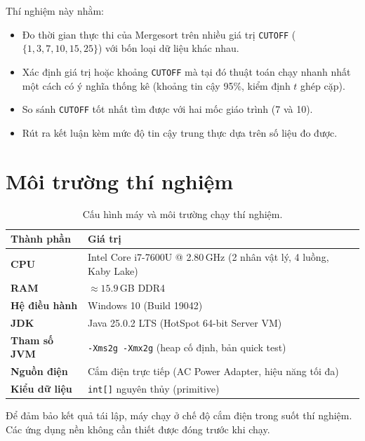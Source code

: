 \documentclass[12pt, a4paper]{article}
\begin{document}
Thí nghiệm này nhằm:
\begin{itemize}
    \item Đo thời gian thực thi của Mergesort trên nhiều giá trị \texttt{CUTOFF}
          ($\{1, 3, 7, 10, 15, 25\}$) với bốn loại dữ liệu khác nhau.
    \item Xác định giá trị hoặc khoảng \texttt{CUTOFF} mà tại đó thuật toán chạy
          nhanh nhất một cách có ý nghĩa thống kê (khoảng tin cậy 95\%, kiểm định
          $t$ ghép cặp).
    \item So sánh \texttt{CUTOFF} tốt nhất tìm được với hai mốc giáo trình (7 và 10).
    \item Rút ra kết luận kèm mức độ tin cậy trung thực dựa trên số liệu đo được.
\end{itemize}

\section{Môi trường thí nghiệm}

\begin{table}[H]
\centering
\caption{Cấu hình máy và môi trường chạy thí nghiệm.}
\label{tab:env}
\renewcommand{\arraystretch}{1.3}
\begin{tabular}{>{\bfseries}l p{10cm}}
\toprule
Thành phần & Giá trị \\
\midrule
\rowcolor{rowodd}  CPU      & Intel Core i7-7600U @ 2.80\,GHz (2 nhân vật lý, 4 luồng, Kaby Lake) \\
\rowcolor{roweven} RAM      & $\approx 15.9$\,GB DDR4 \\
\rowcolor{rowodd}  Hệ điều hành & Windows 10 (Build 19042) \\
\rowcolor{roweven} JDK      & Java 25.0.2 LTS (HotSpot 64-bit Server VM) \\
\rowcolor{rowodd}  Tham số JVM & \texttt{-Xms2g -Xmx2g} (heap cố định, bản quick test) \\
\rowcolor{roweven} Nguồn điện & Cắm điện trực tiếp (AC Power Adapter, hiệu năng tối đa) \\
\rowcolor{rowodd}  Kiểu dữ liệu & \texttt{int[]} nguyên thủy (primitive) \\
\bottomrule
\end{tabular}
\end{table}

Để đảm bảo kết quả tái lập, máy chạy ở chế độ cắm điện trong suốt thí nghiệm.
Các ứng dụng nền không cần thiết được đóng trước khi chạy.
\end{document}
